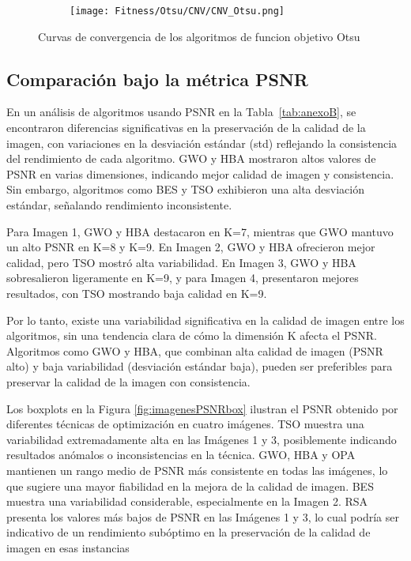 \documentclass[conference]{IEEEtran}
\begin{document}
\begin{figure}
	\centering
	\begin{subfigure}{0.5\textwidth}
		\texttt{[image: Fitness/Otsu/CNV/CNV\_Otsu.png]}
	\end{subfigure}
	\caption{Curvas de convergencia de los algoritmos de funcion objetivo Otsu}
	\label{fig:imagenes}    
\end{figure}


\subsection{Comparación bajo la métrica PSNR}
\noindent En un análisis de algoritmos usando PSNR en la Tabla~\ref{tab:anexoB}, se encontraron diferencias significativas en la preservación de la calidad de la imagen, con variaciones en la desviación estándar (std) reflejando la consistencia del rendimiento de cada algoritmo. GWO y HBA mostraron altos valores de PSNR en varias dimensiones, indicando mejor calidad de imagen y consistencia. Sin embargo, algoritmos como BES y TSO exhibieron una alta desviación estándar, señalando rendimiento inconsistente.

\noindent Para Imagen 1, GWO y HBA destacaron en K=7, mientras que GWO mantuvo un alto PSNR en K=8 y K=9. En Imagen 2, GWO y HBA ofrecieron mejor calidad, pero TSO mostró alta variabilidad. En Imagen 3, GWO y HBA sobresalieron ligeramente en K=9, y para Imagen 4, presentaron mejores resultados, con TSO mostrando baja calidad en K=9.

\noindent Por lo tanto, existe una variabilidad significativa en la calidad de imagen entre los algoritmos, sin una tendencia clara de cómo la dimensión K afecta el PSNR. Algoritmos como GWO y HBA, que combinan alta calidad de imagen (PSNR alto) y baja variabilidad (desviación estándar baja), pueden ser preferibles para preservar la calidad de la imagen con consistencia.

\noindent Los boxplots en la Figura \ref{fig:imagenesPSNRbox} ilustran el PSNR obtenido por diferentes técnicas de optimización en cuatro imágenes. TSO muestra una variabilidad extremadamente alta en las Imágenes 1 y 3, posiblemente indicando resultados anómalos o inconsistencias en la técnica. GWO, HBA y OPA mantienen un rango medio de PSNR más consistente en todas las imágenes, lo que sugiere una mayor fiabilidad en la mejora de la calidad de imagen. BES muestra una variabilidad considerable, especialmente en la Imagen 2. RSA presenta los valores más bajos de PSNR en las Imágenes 1 y 3, lo cual podría ser indicativo de un rendimiento subóptimo en la preservación de la calidad de imagen en esas instancias
\end{document}
